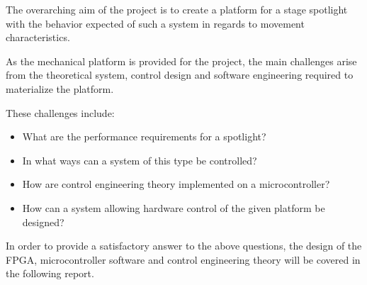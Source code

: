 \documentclass[../../main]{subfiles}
\begin{document}
The overarching aim of the project is to create a platform for a stage spotlight with the behavior expected of such a system in regards to movement characteristics.

As the mechanical platform is provided for the project, the main challenges arise from the theoretical system, control design and software engineering required to materialize the platform.

These challenges include:

\begin{itemize}
    \item What are the performance requirements for a spotlight?
    \item In what ways can a system of this type be controlled?
    \item How are control engineering theory implemented on a microcontroller? 
    \item How can a system allowing hardware control of the given platform be designed?
\end{itemize}

In order to provide a satisfactory answer to the above questions, the design of the FPGA, microcontroller software and control engineering theory will be covered in the following report.
\end{document}
